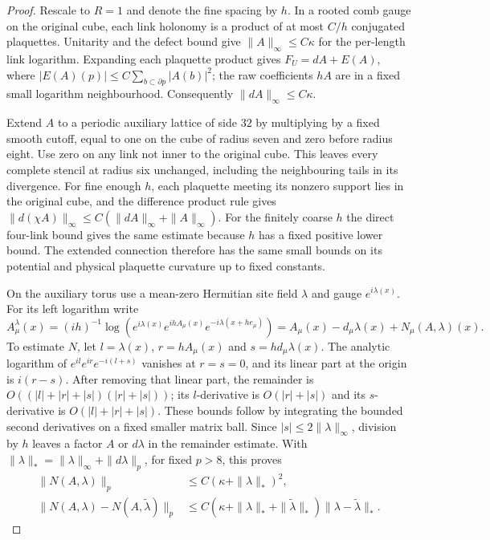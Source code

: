 \documentclass[11pt,letterpaper,reqno]{amsart}
\numberwithin{equation}{section}
\theoremstyle{definition}
\theoremstyle{remark}
\begin{document}
\begin{proof}
Rescale to \(R=1\) and denote the fine spacing by \(h\).
In a rooted comb gauge on the original cube, each link
holonomy is a product of at most \(C/h\) conjugated
plaquettes. Unitarity and the defect bound give
\(\|A\|_\infty\le C\kappa\) for the per-length link logarithm.
Expanding each plaquette product gives
\(F_U=dA+E(A)\), where
\(|E(A)(p)|\le C\sum_{b\subset\partial p}|A(b)|^2\);
the raw coefficients \(hA\) are in a fixed small
logarithm neighbourhood. Consequently \(\|dA\|_\infty\le C\kappa\).

Extend \(A\) to a periodic auxiliary lattice of side \(32\)
by multiplying by a fixed smooth cutoff, equal to one
on the cube of radius seven and zero before radius eight.
Use zero on any link not inner to the original cube.
This leaves every complete stencil at radius six unchanged,
including the neighbouring tails in its divergence.
For fine enough \(h\), each
plaquette meeting its nonzero support lies in the original
cube, and the difference product rule gives
\(\|d(\chi A)\|_\infty\le C(\|dA\|_\infty+\|A\|_\infty)\).
For the finitely coarse \(h\) the direct four-link bound
gives the same estimate because \(h\) has a fixed
positive lower bound. The extended connection therefore
has the same small bounds on its potential and physical
plaquette curvature up to fixed constants.

On the auxiliary torus use a mean-zero Hermitian site
field \(\lambda\) and gauge \(e^{i\lambda(x)}\).
For its left logarithm write
\[
 A^\lambda_\mu(x)=
    (ih)^{-1}\log(e^{i\lambda(x)}
       e^{ih A_\mu(x)}e^{-i\lambda(x+he_\mu)})
       = A_\mu(x)-d_\mu\lambda(x)+N_\mu(A,\lambda)(x).
\]
To estimate \(N\), let \(l=\lambda(x)\), \(r=hA_\mu(x)\)
and \(s=h d_\mu\lambda(x)\). The analytic logarithm of
\(e^{il}e^{ir}e^{-i(l+s)}\) vanishes at \(r=s=0\), and its
linear part at the origin is \(i(r-s)\).
After removing that linear part, the remainder is
\(O((|l|+|r|+|s|)(|r|+|s|))\); its \(l\)-derivative is
\(O(|r|+|s|)\) and its \(s\)-derivative is
\(O(|l|+|r|+|s|)\). These bounds follow by integrating
the bounded second derivatives on a fixed smaller
matrix ball. Since \(|s|\le2\|\lambda\|_\infty\),
division by \(h\) leaves a factor \(A\) or
\(d\lambda\) in the remainder estimate. With
\(\|\lambda\|_*=\|\lambda\|_\infty+\|d\lambda\|_p\),
for fixed \(p>8\), this proves
\[
 \begin{split}
 \|N(A,\lambda)\|_p &\le C(\kappa+\|\lambda\|_*)^2,\\
 \|N(A,\lambda)-N(A,\widetilde\lambda)\|_p
  &\le C(\kappa+\|\lambda\|_*+\|\widetilde\lambda\|_*)
                             \|\lambda-\widetilde\lambda\|_* .
 \end{split}
\]


\end{proof}
\end{document}

